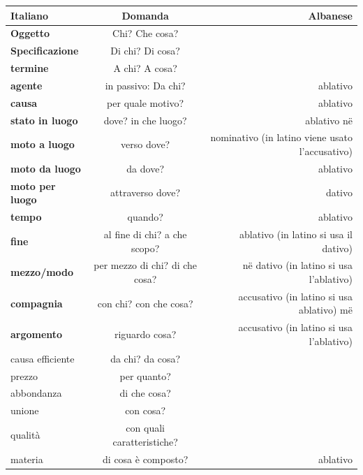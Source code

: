\begin{table}[H]
    \centering
    \begin{tabular}{lcr}
        \toprule
        Italiano            & Domanda                   & Albanese \\
        \midrule
        \textbf{Oggetto}              & Chi? Che cosa?               &\\
        \textbf{Specificazione}      & Di chi? Di cosa?              &\\
        \textbf{termine}             & A chi? A cosa?                &\\
        \textbf{agente}              & in passivo: Da chi?           & ablativo \\
        \textbf{causa}               & per quale motivo?             & ablativo\\
        \textbf{stato in luogo}      & dove? in che luogo?           & ablativo në\\
        \textbf{moto a luogo}        & verso dove?                   & nominativo (in latino viene usato l'accusativo)\\
        \textbf{moto da luogo}       & da dove?                      & ablativo\\
        \textbf{moto per luogo}      & attraverso dove?              & dativo \\
        \textbf{tempo}               & quando?                       & ablativo \\
        \textbf{fine}                & al fine di chi? a che scopo?  & ablativo (in latino si usa il dativo) \\
        \textbf{mezzo/modo}          & per mezzo di chi? di che cosa?& në dativo (in latino si usa l'ablativo) \\
        \textbf{compagnia}           & con chi? con che cosa?        & accusativo (in latino si usa ablativo) më \\
        \textbf{argomento}           & riguardo cosa?                & accusativo (in latino si usa l'ablativo) \\
        causa efficiente    & da chi? da cosa?              &\\
        prezzo              & per quanto?                   &\\
        abbondanza          & di che cosa?                  &\\
        unione              & con cosa?                     &\\
        qualità             & con quali caratteristiche?    &\\
        materia             & di cosa è composto?           & ablativo\\
        

\end{tabular}
\end{table}
